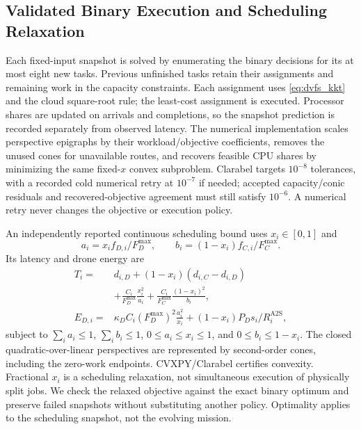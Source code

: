 \subsection{Validated Binary Execution and Scheduling Relaxation}
Each fixed-input snapshot is solved by enumerating the binary decisions for its at most eight new tasks. Previous unfinished tasks retain their assignments and remaining work in the capacity constraints. Each assignment uses \eqref{eq:dvfs_kkt} and the cloud square-root rule; the least-cost assignment is executed. Processor shares are updated on arrivals and completions, so the snapshot prediction is recorded separately from observed latency.
The numerical implementation scales perspective epigraphs by their workload/objective coefficients, removes the unused cones for unavailable routes, and recovers feasible CPU shares by minimizing the same fixed-$x$ convex subproblem. Clarabel targets $10^{-8}$ tolerances, with a recorded cold numerical retry at $10^{-7}$ if needed; accepted capacity/conic residuals and recovered-objective agreement must still satisfy $10^{-6}$. A numerical retry never changes the objective or execution policy.

An independently reported continuous scheduling bound uses $x_i\in[0,1]$ and
\begin{equation}
 a_i=x_i f_{D,i}/F_D^{\max},\qquad
 b_i=(1-x_i)f_{C,i}/F_C^{\max}.
\end{equation}
Its latency and drone energy are
\begin{align}
 T_i={}&d_{i,D}+(1-x_i)(d_{i,C}-d_{i,D})\nonumber\\
 &+\frac{C_i}{F_D^{\max}}\frac{x_i^2}{a_i}
 +\frac{C_i}{F_C^{\max}}\frac{(1-x_i)^2}{b_i},\\
 E_{D,i}={}&\kappa_D C_i(F_D^{\max})^2\frac{a_i^2}{x_i}
 +(1-x_i)P_Ds_i/R_i^{\mathrm{A2S}},
\end{align}
subject to $\sum_i a_i\leq1$, $\sum_i b_i\leq1$, $0\leq a_i\leq x_i\leq1$, and $0\leq b_i\leq1-x_i$. The closed quadratic-over-linear perspectives are represented by second-order cones, including the zero-work endpoints. CVXPY/Clarabel certifies convexity. Fractional $x_i$ is a scheduling relaxation, not simultaneous execution of physically split jobs. We check the relaxed objective against the exact binary optimum and preserve failed snapshots without substituting another policy. Optimality applies to the scheduling snapshot, not the evolving mission.
